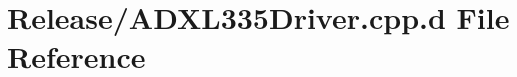 \hypertarget{_release_2_a_d_x_l335_driver_8cpp_8d}{\section{\-Release/\-A\-D\-X\-L335\-Driver.cpp.\-d \-File \-Reference}
\label{_release_2_a_d_x_l335_driver_8cpp_8d}
}
